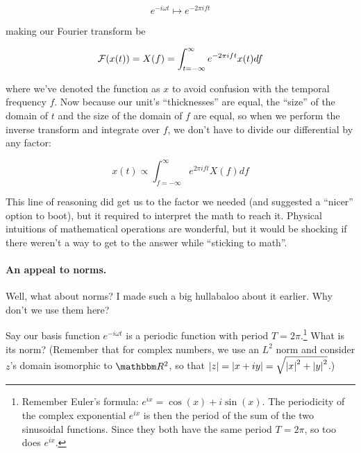 \documentclass[../main/main.tex]{subfiles}
\begin{document}
\[e^{-i\omega t} \mapsto e^{-2\pi ift} \]

making our Fourier transform be

\[\mathcal{F}(x(t)) = X(f) 
  = \int_{t=-\infty}^{\infty} e^{-2\pi ift} x(t) df\]

where we've denoted the function as \(x\)
to avoid confusion with the temporal frequency \(f\).
Now because our unit's ``thicknesses'' are equal,
the ``size'' of the domain of \(t\) and the size of the
domain of \(f\) are equal, so when we perform the
inverse transform and integrate over \(f\), we don't
have to divide our differential by any factor:

\[x(t) \propto 
  \int_{f=-\infty}^{\infty} e^{2\pi ift} X(f) df \]

This line of reasoning did get us to the factor we needed
(and suggested a ``nicer'' option to boot), but it required
to interpret the math to reach it. Physical intuitions
of mathematical operations are wonderful, but it would
be shocking if there weren't a way to get to the answer
while ``sticking to math''.


\paragraph{An appeal to norms.}

Well, what about norms? I made such a big hullabaloo about
it earlier. Why don't we use them here? \par

Say our basis function \(e^{-i\omega t}\) is a periodic function
with period \(T = 2\pi\).\footnote
{
  Remember Euler's formula: \(e^{ix} = \cos(x) + i\sin(x)\).
  The periodicity of the complex exponential \(e^{ix}\) is then
  the period of the sum of the two sinusoidal functions.
  Since they both have the same period \(T = 2\pi\),
  so too does \(e^{ix}\).
} What is its norm? 
(Remember that for complex numbers, we use an 
\(L^2\) norm and consider \(z\)'s domain isomorphic to 
\(\domain{R}^2\), so that \(\abs{z} = \abs{x + iy}
= \sqrt{\abs{x}^2 + \abs{y}^2}\).)
\end{document}
